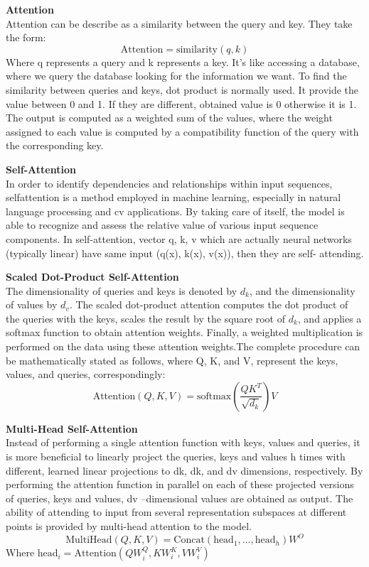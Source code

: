 \textbf{Attention}\\
Attention can be describe as a similarity between the query and key. They take the form:
\begin{equation}
\text{Attention}= \text{similarity}(q, k)
\end{equation}
Where q represents a query and k represents a key. It’s like accessing a database, where
we query the database looking for the information we want. To find the similarity
between queries and keys, dot product is normally used. It provide the value between 0
and 1. If they are different, obtained value is 0 otherwise it is 1. The output is computed
as a weighted sum of the values, where the weight assigned to each value is computed
by a compatibility function of the query with the corresponding key.

\textbf{Self-Attention}\\
In order to identify dependencies and relationships within input sequences, selfattention is a method employed in machine learning, especially in natural language
processing and \gls{cv} applications. By taking care of itself, the model is able
to recognize and assess the relative value of various input sequence components. In
self-attention, vector q, k, v which are actually neural networks (typically linear) have
same input (q(x), k(x), v(x)), then they are self- attending.

\textbf{Scaled Dot-Product Self-Attention}\\
The dimensionality of queries and keys is denoted by \( d_k \), and the dimensionality of values by \( d_v \). The scaled dot-product attention computes the dot product of the queries with the keys, scales the result by the square root of \( d_k \), and applies a softmax function to obtain attention weights. Finally, a weighted multiplication is performed on the data using these attention weights.The complete procedure can be mathematically stated
as follows, where Q, K, and V, represent the keys, values, and queries, correspondingly:
\begin{equation}
\text{Attention}(Q, K, V) = \text{softmax}\left(\frac{QK^T}{\sqrt{d_k}}\right) V
\end{equation}

\textbf{Multi-Head Self-Attention}\\
Instead of performing a single attention function with keys, values and queries, it is
more beneficial to linearly project the queries, keys and values h times with different,
learned linear projections to dk, dk, and dv dimensions, respectively. By performing the
attention function in parallel on each of these projected versions of queries, keys and
values, dv –dimensional values are obtained as output. The ability of attending to input
from several representation subspaces at different points is provided by multi-head
attention to the model.
\begin{equation}
\text{MultiHead}(Q, K, V) = \text{Concat}(\text{head}_1, \dots, \text{head}_h) W^O
\end{equation}
Where \(\text{head}_i = \text{Attention}(QW_i^Q, KW_i^K, VW_i^V)\)

